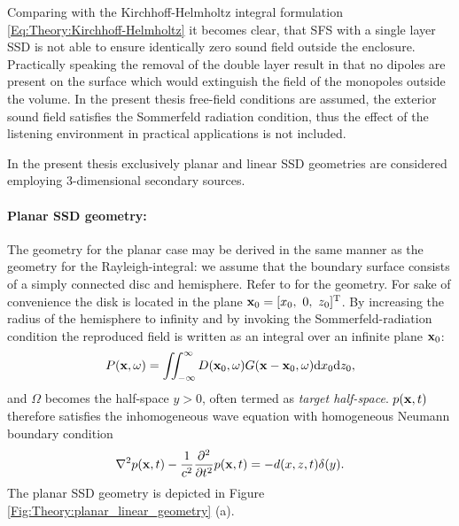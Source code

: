 Comparing with the Kirchhoff-Helmholtz integral formulation \eqref{Eq:Theory:Kirchhoff-Helmholtz} it becomes clear, that SFS with a single layer SSD is not able to ensure identically zero sound field outside the enclosure. Practically speaking the removal of the double layer result in that no dipoles are present on the surface which would extinguish the field of the monopoles outside the volume.
In the present thesis free-field conditions are assumed, the exterior sound field satisfies the Sommerfeld radiation condition, thus the effect of the listening environment in practical applications is not included.

In the present thesis exclusively planar and linear SSD geometries are considered employing 3-dimensional secondary sources.

\paragraph{Planar SSD geometry:}
The geometry for the planar case may be derived in the same manner as the geometry for the Rayleigh-integral: we assume that the boundary surface consists of a simply connected disc and hemisphere. Refer to \cite[p.~84,p.~275]{Ahrens2012, Williams1999} for the geometry. For sake of convenience the disk is located in the plane $\mathbf{x}_0 = [x_0,\ 0,\ z_0]^{\mathrm{T}}$. By increasing the radius of the hemisphere to infinity and by invoking the Sommerfeld-radiation condition the reproduced field is written as an integral over an infinite plane $\mathbf{x}_0$:
\begin{equation}
P(\mathbf{x},\omega) = \iint_{-\infty}^{\infty} D(\mathbf{x}_0,\omega) G(\mathbf{x} - \mathbf{x}_0 , \omega ) \mathrm{d} x_0 \mathrm{d} z_0,
\label{Eq:Theory:3D_planar_SFS}
\end{equation}
and $\Omega$ becomes the half-space $y>0$, often termed as \emph{target half-space}.
$p(\mathbf{x},t)$ therefore satisfies the inhomogeneous wave equation with homogeneous Neumann boundary condition
\begin{equation}
\nabla^2 p(\mathbf{x},t) - \frac{1}{c^2}\frac{\partial^2}{\partial t^2} p(\mathbf{x},t) = - d(x,z,t)\delta(y).
\label{Eq:Theory:3D_planar_SFS_time}
\end{equation}
The planar SSD geometry is depicted in Figure \ref{Fig:Theory:planar_linear_geometry} (a).

